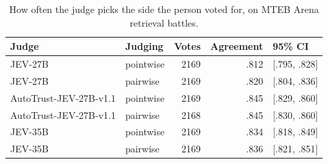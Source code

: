 \begin{table}[t]
\centering\small
\begin{tabular}{llrrl}
\toprule
Judge & Judging & Votes & Agreement & 95\% CI \\
\midrule
JEV-27B & pointwise & 2169 & .812 & [.795, .828] \\
JEV-27B & pairwise & 2169 & .820 & [.804, .836] \\
AutoTrust-JEV-27B-v1.1 & pointwise & 2169 & .845 & [.829, .860] \\
AutoTrust-JEV-27B-v1.1 & pairwise & 2168 & .845 & [.830, .860] \\
JEV-35B & pointwise & 2169 & .834 & [.818, .849] \\
JEV-35B & pairwise & 2169 & .836 & [.821, .851] \\
\bottomrule
\end{tabular}
\caption{How often the judge picks the side the person voted for, on MTEB Arena retrieval battles.}
\label{tab:arena}
\end{table}
